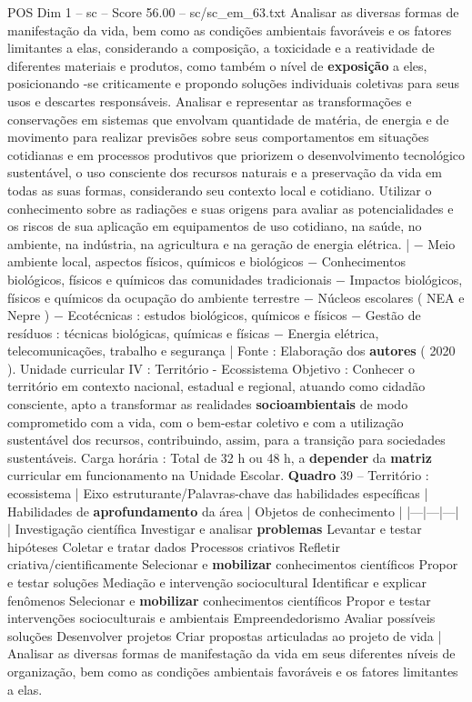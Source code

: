\begin{textsample}{POS Dim 1 – sc – Score 56.00 – sc/sc\_em\_63.txt}
Analisar as diversas formas de manifestação da vida, bem como as condições ambientais favoráveis e os fatores limitantes a elas, considerando a composição, a toxicidade e a reatividade de diferentes materiais e produtos, como também o nível de \textbf{exposição} a eles, posicionando -se criticamente e propondo soluções individuais coletivas para seus usos e descartes responsáveis.
Analisar e representar as transformações e conservações em sistemas que envolvam quantidade de matéria, de energia e de movimento para realizar previsões sobre seus comportamentos em situações cotidianas e em processos produtivos que priorizem o desenvolvimento tecnológico sustentável, o uso consciente dos recursos naturais e a preservação da vida em todas as suas formas, considerando seu contexto local e cotidiano.
Utilizar o conhecimento sobre as radiações e suas origens para avaliar as potencialidades e os riscos de sua aplicação em equipamentos de uso cotidiano, na saúde, no ambiente, na indústria, na agricultura e na geração de energia elétrica. | − Meio ambiente local, aspectos físicos, químicos e biológicos − Conhecimentos biológicos, físicos e químicos das comunidades tradicionais − Impactos biológicos, físicos e químicos da ocupação do ambiente terrestre − Núcleos escolares ( NEA e Nepre ) − Ecotécnicas : estudos biológicos, químicos e físicos − Gestão de resíduos : técnicas biológicas, químicas e físicas − Energia elétrica, telecomunicações, trabalho e segurança | Fonte : Elaboração dos \textbf{autores} ( 2020 ).
Unidade curricular IV : Território - Ecossistema Objetivo : Conhecer o território em contexto nacional, estadual e regional, atuando como cidadão consciente, apto a transformar as realidades \textbf{socioambientais} de modo comprometido com a vida, com o bem-estar coletivo e com a utilização sustentável dos recursos, contribuindo, assim, para a transição para sociedades sustentáveis.
Carga horária : Total de 32 h ou 48 h, a \textbf{depender} da \textbf{matriz} curricular em funcionamento na Unidade Escolar. \textbf{Quadro} 39 – Território : ecossistema | Eixo estruturante/Palavras-chave das habilidades específicas | Habilidades de \textbf{aprofundamento} da área | Objetos de conhecimento | |---|---|---| | Investigação científica Investigar e analisar \textbf{problemas} Levantar e testar hipóteses Coletar e tratar dados Processos criativos Refletir criativa/cientificamente Selecionar e \textbf{mobilizar} conhecimentos científicos Propor e testar soluções Mediação e intervenção sociocultural Identificar e explicar fenômenos Selecionar e \textbf{mobilizar} conhecimentos científicos Propor e testar intervenções socioculturais e ambientais Empreendedorismo Avaliar possíveis soluções Desenvolver projetos Criar propostas articuladas ao projeto de vida | Analisar as diversas formas de manifestação da vida em seus diferentes níveis de organização, bem como as condições ambientais favoráveis e os fatores limitantes a elas.

\end{textsample}
